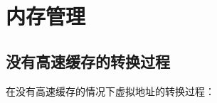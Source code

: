 \chapter{内存管理}



\paragraph{}
\paragraph{}
\paragraph{}
\paragraph{}
\paragraph{}
\paragraph{}
\paragraph{}
\paragraph{}
\paragraph{}
\paragraph{}











\section{没有高速缓存的转换过程}

在没有高速缓存的情况下虚拟地址的转换过程：

